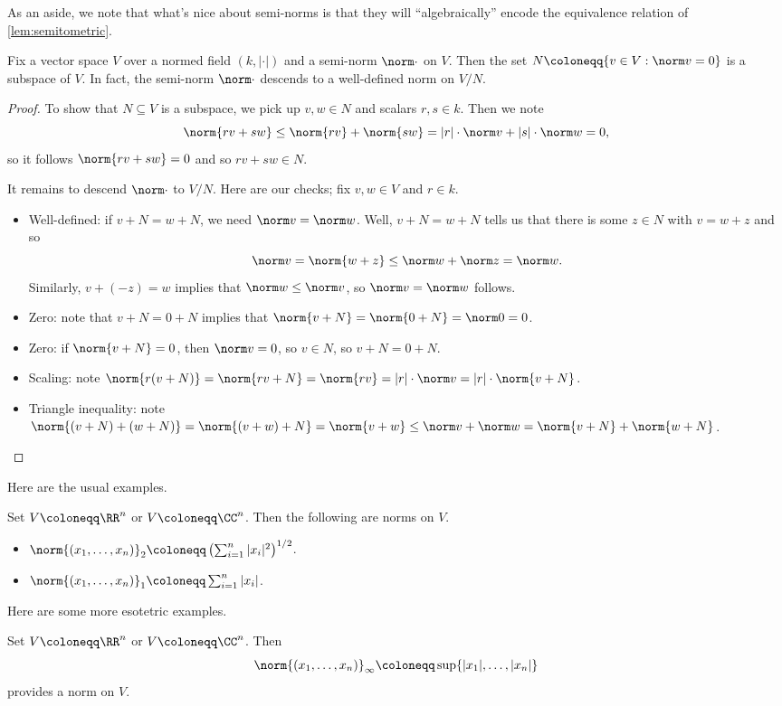 \documentclass[../notes.tex]{subfiles}
\begin{document}
As an aside, we note that what's nice about semi-norms is that they will ``algebraically'' encode the equivalence relation of \autoref{lem:semitometric}.
\begin{prop} \label{prop:semi-norm-to-norm}
	Fix a vector space $V$ over a normed field $(k,|\cdot|)$ and a semi-norm $\norm\cdot$ on $V$. Then the set $N\coloneqq\{v\in V:\norm v=0\}$ is a subspace of $V$. In fact, the semi-norm $\norm\cdot$ descends to a well-defined norm on $V/N$.
\end{prop}
\begin{proof}
	To show that $N\subseteq V$ is a subspace, we pick up $v,w\in N$ and scalars $r,s\in k$. Then we note
	\[\norm{rv+sw}\le\norm{rv}+\norm{sw}=|r|\cdot\norm v+|s|\cdot\norm w=0,\]
	so it follows $\norm{rv+sw}=0$ and so $rv+sw\in N$.

	It remains to descend $\norm\cdot$ to $V/N$. Here are our checks; fix $v,w\in V$ and $r\in k$.
	\begin{itemize}
		\item Well-defined: if $v+N=w+N$, we need $\norm v=\norm w$. Well, $v+N=w+N$ tells us that there is some $z\in N$ with $v=w+z$ and so
		\[\norm v=\norm{w+z}\le\norm w+\norm z=\norm w.\]
		Similarly, $v+(-z)=w$ implies that $\norm w\le\norm v$, so $\norm v=\norm w$ follows.
		\item Zero: note that $v+N=0+N$ implies that $\norm{v+N}=\norm{0+N}=\norm0=0$.
		\item Zero: if $\norm{v+N}=0$, then $\norm v=0$, so $v\in N$, so $v+N=0+N$.
		\item Scaling: note $\norm{r(v+N)}=\norm{rv+N}=\norm{rv}=|r|\cdot\norm v=|r|\cdot\norm{v+N}$.
		\item Triangle inequality: note $\norm{(v+N)+(w+N)}=\norm{(v+w)+N}=\norm{v+w}\le\norm v+\norm w=\norm{v+N}+\norm{w+N}$.
	\end{itemize}
\end{proof}
Here are the usual examples.
\begin{example}
	Set $V\coloneqq\RR^n$ or $V\coloneqq\CC^n$. Then the following are norms on $V$.
	\begin{itemize}
		\item $\norm{(x_1,\ldots,x_n)}_2\coloneqq\left(\sum_{i=1}^n|x_i|^2\right)^{1/2}$.
		\item $\norm{(x_1,\ldots,x_n)}_1\coloneqq\sum_{i=1}^n|x_i|$.
	\end{itemize}
\end{example}
Here are some more esotetric examples.
\begin{example}
	Set $V\coloneqq\RR^n$ or $V\coloneqq\CC^n$. Then
	\[\norm{(x_1,\ldots,x_n)}_\infty\coloneqq\sup\{|x_1|,\ldots,|x_n|\}\]
	provides a norm on $V$.
\end{example}
\end{document}

